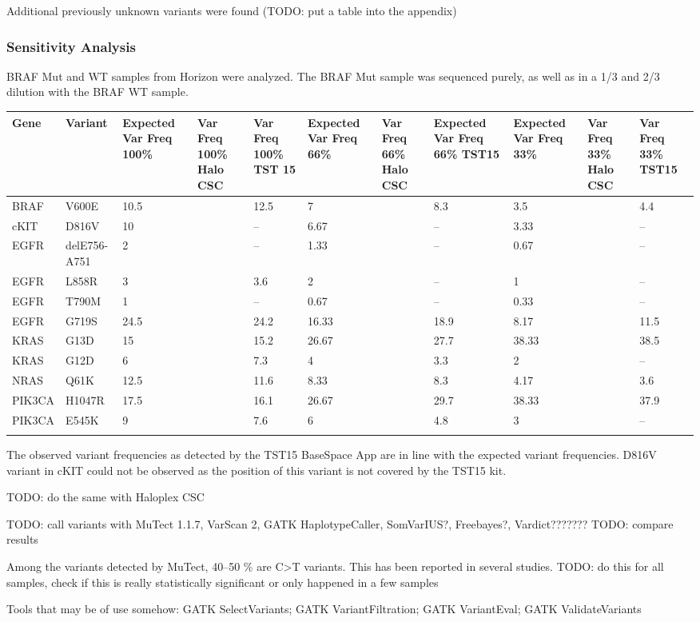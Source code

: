 Additional previously unknown variants were found (TODO: put a table into the appendix)

\subsubsection{Sensitivity Analysis}
BRAF Mut and WT samples from Horizon were analyzed. The BRAF Mut sample was
sequenced purely, as well as in a 1/3 and 2/3 dilution with the BRAF WT sample.

\begin{table}
\begin{tabular}{p{3.5cm} p{1cm} p{1cm}}\\
\hline
Gene & Variant & Expected Var Freq 100\% &  Var Freq 100\% Halo CSC &  Var Freq 100\% TST 15 & Expected Var Freq 66\% &  Var Freq 66\% Halo CSC & Expected Var Freq 66\% TST15 & Expected Var Freq 33\% & Var Freq 33\% Halo CSC & Var Freq 33\% TST15 \\
\hline
BRAF & V600E & 10.5 & & 12.5 & 7 & & 8.3 & 3.5 & & 4.4 \\
cKIT & D816V & 10 & & -- & 6.67 & & -- & 3.33 & & -- \\
EGFR & delE756-A751 & 2 & & -- & 1.33 & & -- & 0.67 & & -- \\
EGFR & L858R & 3 & & 3.6 & 2 & & -- & 1 & & -- \\
EGFR & T790M & 1 & & -- & 0.67 & & -- & 0.33 & & -- \\
EGFR & G719S & 24.5 & & 24.2 & 16.33 & & 18.9 & 8.17 & & 11.5 \\
KRAS & G13D & 15 & & 15.2 & 26.67 & & 27.7 & 38.33 & & 38.5 \\
KRAS & G12D & 6 & & 7.3 & 4 & & 3.3 & 2 & & -- \\
NRAS & Q61K & 12.5 & & 11.6 & 8.33 & & 8.3 & 4.17 & & 3.6 \\
PIK3CA & H1047R & 17.5 & & 16.1 & 26.67 & & 29.7 & 38.33 & & 37.9 \\
PIK3CA & E545K & 9 & & 7.6 & 6 & & 4.8 & 3 & & -- \\
\label{horizon_analysis}
\end{tabular}
\end{table}

The observed variant frequencies as detected by the TST15 BaseSpace App are
in line with the expected variant frequencies. D816V variant in cKIT could
not be observed as the position of this variant is not covered by the TST15 kit.

TODO: do the same with Haloplex CSC

TODO: call variants with MuTect 1.1.7, VarScan 2, GATK HaplotypeCaller, SomVarIUS?, Freebayes?, Vardict???????
TODO: compare results

Among the variants detected by MuTect, 40--50 \% are C>T variants. This has been reported in several studies.
TODO: do this for all samples, check if this is really statistically significant or only happened in a few samples

Tools that may be of use somehow: GATK SelectVariants; GATK VariantFiltration; GATK VariantEval; GATK ValidateVariants
